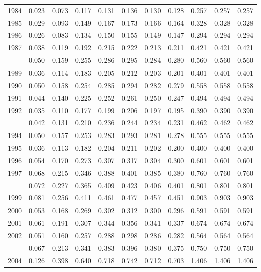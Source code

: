 \documentclass[
]{article}
\begin{document}
\begin{longtable}[t]{lrrrrrrrrrr}
1984 & 0.023 & 0.073 & 0.117 & 0.131 & 0.136 & 0.130 & 0.128 & 0.257 & 0.257 & 0.257\\
1985 & 0.029 & 0.093 & 0.149 & 0.167 & 0.173 & 0.166 & 0.164 & 0.328 & 0.328 & 0.328\\
1986 & 0.026 & 0.083 & 0.134 & 0.150 & 0.155 & 0.149 & 0.147 & 0.294 & 0.294 & 0.294\\
1987 & 0.038 & 0.119 & 0.192 & 0.215 & 0.222 & 0.213 & 0.211 & 0.421 & 0.421 & 0.421\\
\addlinespace
1988 & 0.050 & 0.159 & 0.255 & 0.286 & 0.295 & 0.284 & 0.280 & 0.560 & 0.560 & 0.560\\
1989 & 0.036 & 0.114 & 0.183 & 0.205 & 0.212 & 0.203 & 0.201 & 0.401 & 0.401 & 0.401\\
1990 & 0.050 & 0.158 & 0.254 & 0.285 & 0.294 & 0.282 & 0.279 & 0.558 & 0.558 & 0.558\\
1991 & 0.044 & 0.140 & 0.225 & 0.252 & 0.261 & 0.250 & 0.247 & 0.494 & 0.494 & 0.494\\
1992 & 0.035 & 0.110 & 0.177 & 0.199 & 0.206 & 0.197 & 0.195 & 0.390 & 0.390 & 0.390\\
\addlinespace
1993 & 0.042 & 0.131 & 0.210 & 0.236 & 0.244 & 0.234 & 0.231 & 0.462 & 0.462 & 0.462\\
1994 & 0.050 & 0.157 & 0.253 & 0.283 & 0.293 & 0.281 & 0.278 & 0.555 & 0.555 & 0.555\\
1995 & 0.036 & 0.113 & 0.182 & 0.204 & 0.211 & 0.202 & 0.200 & 0.400 & 0.400 & 0.400\\
1996 & 0.054 & 0.170 & 0.273 & 0.307 & 0.317 & 0.304 & 0.300 & 0.601 & 0.601 & 0.601\\
1997 & 0.068 & 0.215 & 0.346 & 0.388 & 0.401 & 0.385 & 0.380 & 0.760 & 0.760 & 0.760\\
\addlinespace
1998 & 0.072 & 0.227 & 0.365 & 0.409 & 0.423 & 0.406 & 0.401 & 0.801 & 0.801 & 0.801\\
1999 & 0.081 & 0.256 & 0.411 & 0.461 & 0.477 & 0.457 & 0.451 & 0.903 & 0.903 & 0.903\\
2000 & 0.053 & 0.168 & 0.269 & 0.302 & 0.312 & 0.300 & 0.296 & 0.591 & 0.591 & 0.591\\
2001 & 0.061 & 0.191 & 0.307 & 0.344 & 0.356 & 0.341 & 0.337 & 0.674 & 0.674 & 0.674\\
2002 & 0.051 & 0.160 & 0.257 & 0.288 & 0.298 & 0.286 & 0.282 & 0.564 & 0.564 & 0.564\\
\addlinespace
2003 & 0.067 & 0.213 & 0.341 & 0.383 & 0.396 & 0.380 & 0.375 & 0.750 & 0.750 & 0.750\\
2004 & 0.126 & 0.398 & 0.640 & 0.718 & 0.742 & 0.712 & 0.703 & 1.406 & 1.406 & 1.406\\

\end{longtable}
\end{document}
